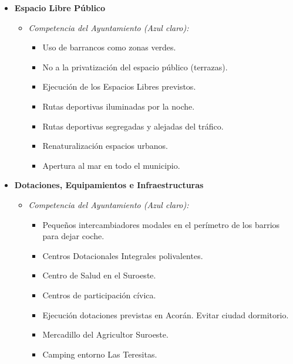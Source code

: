 \begin{itemize}
\begin{itemize}
        \item \textbf{Espacio Libre Público}
        \begin{itemize}
            \item \textit{Competencia del Ayuntamiento (Azul claro):}
            \begin{itemize}
                \item Uso de barrancos como zonas verdes.
                \item No a la privatización del espacio público (terrazas).
                \item Ejecución de los Espacios Libres previstos.
                \item Rutas deportivas iluminadas por la noche.
                \item Rutas deportivas segregadas y alejadas del tráfico.
                \item Renaturalización espacios urbanos.
                \item Apertura al mar en todo el municipio.
            \end{itemize}
        \end{itemize}

        \item \textbf{Dotaciones, Equipamientos e Infraestructuras}
        \begin{itemize}
            \item \textit{Competencia del Ayuntamiento (Azul claro):}
            \begin{itemize}
                \item Pequeños intercambiadores modales en el perímetro de los barrios para dejar coche.
                \item Centros Dotacionales Integrales polivalentes.
                \item Centro de Salud en el Suroeste.
                \item Centros de participación cívica.
                \item Ejecución dotaciones previstas en Acorán. Evitar ciudad dormitorio.
                \item Mercadillo del Agricultor Suroeste.
                \item Camping entorno Las Teresitas.
            \end{itemize}
        \end{itemize}


\end{itemize}
\end{itemize}
